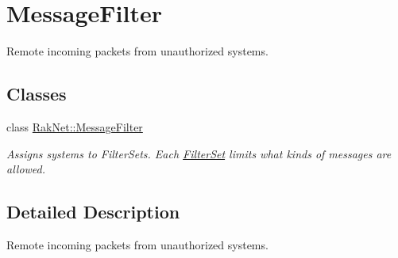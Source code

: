 \hypertarget{group___m_e_s_s_a_g_e_f_i_l_t_e_r___g_r_o_u_p}{\section{Message\-Filter}
\label{group___m_e_s_s_a_g_e_f_i_l_t_e_r___g_r_o_u_p}
}


Remote incoming packets from unauthorized systems.  


\subsection*{Classes}
\begin{DoxyCompactItemize}
\item 
class \hyperlink{class_rak_net_1_1_message_filter}{Rak\-Net\-::\-Message\-Filter}
\begin{DoxyCompactList}\small\item\em Assigns systems to Filter\-Sets. Each \hyperlink{struct_rak_net_1_1_filter_set}{Filter\-Set} limits what kinds of messages are allowed. \end{DoxyCompactList}\end{DoxyCompactItemize}


\subsection{Detailed Description}
Remote incoming packets from unauthorized systems. 